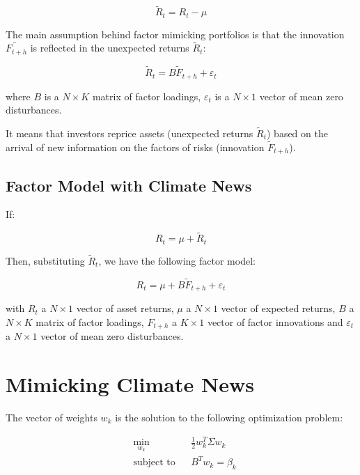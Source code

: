 \begin{equation}
    \tilde{R}_t = R_t - \mu
\end{equation}

The main assumption behind factor mimicking portfolios is that the innovation 
$\tilde{F_{t+h}}$ is reflected in the unexpected returns $\tilde{R}_t$:

\begin{equation}
    \tilde{R}_t = B \tilde{F}_{t+h} + \varepsilon_t
\end{equation}
    
where $B$ is a $N \times K$ matrix of factor loadings, $\varepsilon_t$ is a $N \times 1$ vector of mean zero disturbances.

It means that investors reprice assets (unexpected returns $\tilde{R}_t$) based on the arrival of new information on the factors of risks (innovation $\tilde{F}_{t+h}$).


\subsection{Factor Model with Climate News}

If:

\begin{equation}
    R_t = \mu + \tilde{R}_t
\end{equation}

Then, substituting $\tilde{R}_t$, we have the following factor model:

\begin{equation}
    R_t = \mu + B \tilde{F}_{t+h} + \varepsilon_t
\end{equation}

with $R_t$ a $N \times 1$ vector of 
asset returns, $\mu$ a $N \times 1$ vector
of expected returns, $B$ a $N \times K$ matrix
of factor loadings, $F_{t+h}$ a $K \times 1$ vector
of factor innovations and $\varepsilon_t$ a $N \times 1$
vector of mean zero disturbances.



\section{Mimicking Climate News}

The vector of weights $w_k$ 
is the solution to the following optimization problem:

\begin{equation}
    \begin{aligned}
        & \underset{w_k}{\min}
        & &  \frac{1}{2} w_k^T \Sigma w_k \\
        & \text{subject to}
        & & B^T w_k = \beta_k
    \end{aligned}
\end{equation}

